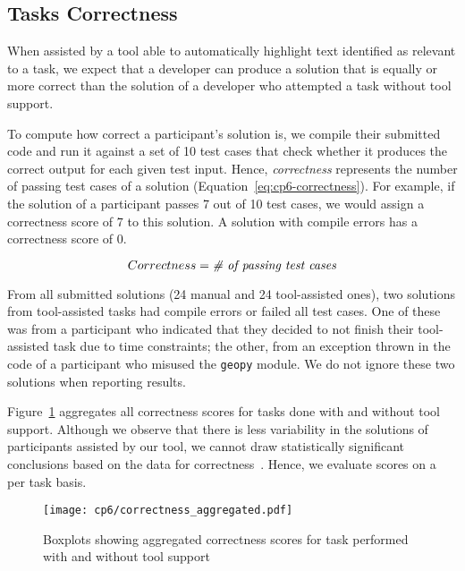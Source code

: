 
\subsection{Tasks Correctness}
\label{cp6:correctness}



When assisted by a tool able to automatically highlight text identified as relevant to a task, we expect that a developer can produce a solution 
that is equally or more correct than the solution of a developer who attempted a task without tool support. 


To compute how correct a participant's solution is, 
we compile their submitted code and run it against a set of 10 test cases that check whether it produces the correct output for each given test input. 
Hence, \textit{correctness} represents the number of passing test cases of a solution (Equation~\ref{eq:cp6-correctness}).
For example, if the solution of a participant passes 7 out of 10 test cases, we would assign a 
correctness score of $7$ to this solution. 
A solution with compile errors has a correctness score of $0$.


\begin{small}
\begin{equation}
    Correctness = \text{\textit{\# of passing test cases}}
    \label{eq:cp6-correctness}
\end{equation}
\end{small}



From all submitted solutions (24 manual and 24 tool-assisted ones), two 
solutions from tool-assisted tasks had compile errors or failed all test cases. 
One of these
was from a participant who indicated that they decided to not finish their tool-assisted task due to time constraints; 
the other, from an exception thrown in the code of a participant who misused the \texttt{geopy} module. We do not ignore these two solutions when reporting results.



Figure~\ref{fig:correctness-overall} aggregates all correctness scores for tasks done with and without tool support.
Although we observe that there is less variability in the solutions of participants assisted by our tool,
we cannot draw statistically significant conclusions based on the data for correctness~\cite{Lazar2017-cp3}.
Hence, we evaluate scores on a per task basis.



\medskip
\begin{figure}[h!]
    \centering
    \texttt{[image: cp6/correctness\_aggregated.pdf]}
    \caption{Boxplots showing aggregated correctness scores for task performed with and without tool support}
    \label{fig:correctness-overall}
\end{figure}



